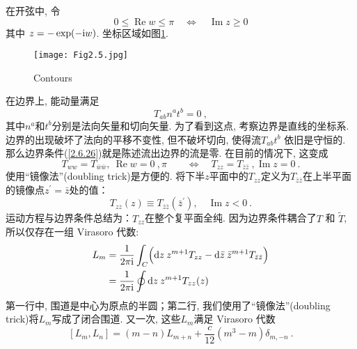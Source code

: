 在开弦中, 令
\begin{equation}
0 \leq \operatorname{Re} w \leq \pi \quad \Leftrightarrow \quad \operatorname{Im} z \geq 0
\end{equation}
其中
$z=-\exp (-\mathrm{i} w)$. 
坐标区域如图\ref{Fig2.5}.
\begin{figure}[h]
	\begin{center}
		\texttt{[image: Fig2.5.jpg]}\\
		\caption{Contours}\label{Fig2.5}
	\end{center}
\end{figure}


\noindent 在边界上, 能动量满足
\begin{equation}\label{2.6.26}
T_{a b} n^{a} t^{b}=0 \:,
\end{equation}
其中$n^{a}$和$t^{b}$分别是法向矢量和切向矢量. 为了看到这点, 考察边界是直线的坐标系. 边界的出现破坏了法向的平移不变性, 但不破坏切向, 使得流$T_{a b} t^{b}$ 依旧是守恒的. 那么边界条件(\ref{2.6.26})就是陈述流出边界的流是零. 在目前的情况下, 这变成
\begin{equation}
T_{w w}=T_{\bar{w} \bar{w}}, \: \operatorname{Re} w=0 \:, \pi \qquad \Leftrightarrow \quad T_{z z}=T_{\bar{z} \bar{z}}\:, \operatorname{Im} z=0 \:.
\end{equation}
使用“镜像法”(doubling trick)是方便的. 将下半$z$平面中的$T_{zz}$定义为$T_{\bar{z} \bar{z}}$在上半平面的镜像点$z^{\prime}=\bar{z}$处的值：
\begin{equation}
T_{z z}(z) \equiv T_{\bar{z} \bar{z}}\left(\bar{z}^{\prime}\right), \quad \operatorname{Im} z<0 \:.
\end{equation}
运动方程与边界条件总结为：$T_{z z}$在整个复平面全纯. 因为边界条件耦合了$T$ 和 $\widetilde{T}$, 所以仅存在一组 Virasoro 代数:
\begin{align}
L_{m} &=\frac{1}{2 \pi \mathrm{i}} \int_{C}\Bigl(\mathrm{d} z \:z^{m+1} T_{z z}-\mathrm{d} \bar{z} \: \bar{z}^{m+1} T_{\bar{z} \bar{z}}\Bigr) \nonumber  \\
&=\frac{1}{2 \pi \mathrm{i}} \oint \mathrm{d} z\: z^{m+1} T_{z z}(z)
\end{align}
第一行中, 围道是中心为原点的半圆；第二行, 我们使用了“镜像法”(doubling trick)将$L_m$写成了闭合围道. 又一次, 这些$L_{m}$满足 Virasoro 代数
\begin{equation}
\left[L_{m}, L_{n}\right]=(m-n) L_{m+n}+\frac{c}{12}\left(m^{3}-m\right) \delta_{m,-n} \:.
\end{equation}

